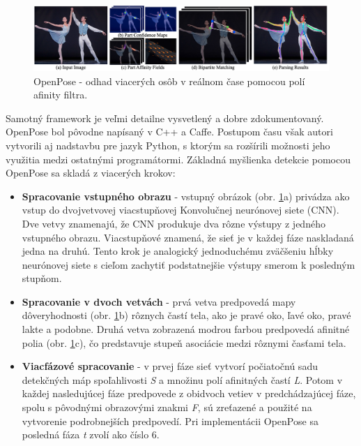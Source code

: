 \documentclass[slovak,master,dept460,male,cpp,cpdeclaration]{diploma}
\begin{document}
\begin{figure}[H]
	\centering
	\includegraphics[width=1\textwidth]{Figures/openposePipeline.png}
	\caption{OpenPose - odhad viacerých osôb v reálnom čase pomocou polí afinity filtra.\cite{cao2018openpose}}
	\label{fig:openposeOverall}
\end{figure}

 Samotný framework je veľmi detailne vysvetlený a dobre zdokumentovaný. OpenPose bol pôvodne napísaný v C++ a Caffe\cite{jia2014caffe}. Postupom času však  autori vytvorili aj  nadstavbu pre jazyk Python, s ktorým sa rozšírili možnosti jeho využitia medzi ostatnými programátormi. Základná myšlienka detekcie pomocou OpenPose sa skladá z viacerých krokov:

\begin{itemize}
\item \textbf{Spracovanie vstupného obrazu} - vstupný obrázok (obr. \ref{fig:openposeOverall}a) privádza ako vstup do dvojvetvovej viacstupňovej Konvolučnej neurónovej siete (CNN). Dve vetvy znamenajú, že CNN produkuje dva rôzne výstupy z jedného vstupného obrazu. Viacstupňové znamená, že sieť je v každej fáze naskladaná jedna na druhú. Tento krok je analogický jednoduchému zväčšeniu hĺbky neurónovej siete s cieľom zachytiť podstatnejšie výstupy smerom k posledným stupňom.

\item \textbf{Spracovanie v dvoch vetvách} - prvá vetva predpovedá mapy dôveryhodnosti (obr. \ref{fig:openposeOverall}b) rôznych častí tela, ako je pravé oko, ľavé oko, pravé lakte a podobne. Druhá vetva zobrazená modrou farbou predpovedá afinitné polia (obr. \ref{fig:openposeOverall}c), čo predstavuje stupeň asociácie medzi rôznymi časťami tela.

\item \textbf{Viacfázové spracovanie} - v prvej fáze sieť vytvorí počiatočnú sadu detekčných máp spoľahlivosti \textit{S} a množinu polí afinitných častí \textit{L}. Potom v každej nasledujúcej fáze predpovede z obidvoch vetiev v predchádzajúcej fáze, spolu s pôvodnými obrazovými znakmi \textit{F}, sú zreťazené a použité na vytvorenie podrobnejších predpovedí. Pri implementácii OpenPose sa posledná fáza \textit{t} zvolí ako číslo 6.
\end{itemize}
\end{document}
